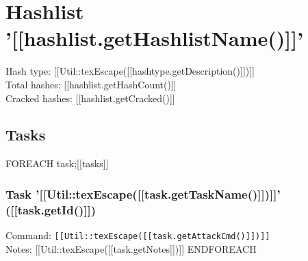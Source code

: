 \documentclass[12pt]{article}
\begin{document}
\section*{Hashlist '[[hashlist.getHashlistName()]]'}

Hash type: [[Util::texEscape([[hashtype.getDescription()]])]]\\
Total hashes: [[hashlist.getHashCount()]]\\
Cracked hashes: [[hashlist.getCracked()]]\\

\subsection*{Tasks}

{{FOREACH task;[[tasks]]}}
	\subsubsection{Task '[[Util::texEscape([[task.getTaskName()]])]]' ([[task.getId()]])}
	Command: \texttt{[[Util::texEscape([[task.getAttackCmd()]])]]}\\
	Notes: [[Util::texEscape([[task.getNotes]])]]
{{ENDFOREACH}}
\end{document}
